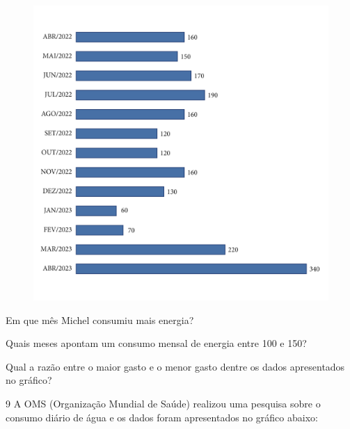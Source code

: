 \begin{figure}[htpb!]
\includegraphics[width=\textwidth]{../ilustracoes/MAT5/SAEB_5ANO_MAT_figura107.png}
\end{figure}

\begin{escolha}
\item
  Em que mês Michel consumiu mais energia?


\item
  Quais meses apontam um consumo mensal de energia entre 100 e 150?


\item
  Qual a razão entre o maior gasto e o menor gasto dentre os dados
  apresentados no gráfico?

\end{escolha}


\num{9} A OMS (Organização Mundial de Saúde) realizou uma pesquisa sobre o
consumo diário de água e os dados foram apresentados no gráfico abaixo:

